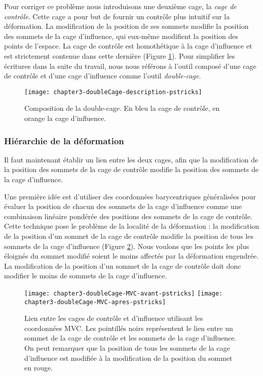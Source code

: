 Pour corriger ce problème nous introduisons une deuxième cage, la \textit{cage
de contrôle}. Cette cage a pour but de fournir un contrôle plus intuitif sur
la déformation. La modification de la position de ses sommets modifie la
position des sommets de la cage d'influence, qui eux-même modifient la
position des points de l'espace. La cage de contrôle est homothétique à la
cage d'influence et est strictement contenue dans cette dernière (Figure
\ref{MELDou}). Pour simplifier les écritures dans la suite du travail, nous
nous référons à l'outil composé d'une cage de contrôle et d'une cage
d'influence comme l'outil \textit{double-cage}.

\begin{figure}[!ht]
    \texttt{[image: chapter3-doubleCage-description-pstricks]}

    \caption[Composition de la double-cage] {Composition de la double-cage. En
    bleu la cage de contrôle, en orange la cage d'influence.}

    \label{MELDou}
\end{figure}

\subsubsection{Hiérarchie de la déformation}

Il faut maintenant établir un lien entre les deux cages, afin que la
modification de la position des sommets de la cage de contrôle modifie la
position des sommets de la cage d'influence.

Une première idée est d'utiliser des coordonnées barycentriques généralisées
pour évaluer la position de chacun des sommets de la cage d'influence comme
une combinaison linéaire pondérée des positions des sommets de la cage de
contrôle. Cette technique pose le problème de la localité de la déformation :
la modification de la position d'un sommet de la cage de contrôle modifie la
position de tous les sommets de la cage d'influence (Figure \ref{MELDMV}).
Nous voulons que les points les plus éloignés du sommet modifié soient le
moins affectés par la déformation engendrée. La modification de la position
d'un sommet de la cage de contrôle doit donc modifier le moins de sommets de
la cage d'influence.

\begin{figure}[!ht]
  \texttt{[image: chapter3-doubleCage-MVC-avant-pstricks]}
  \texttt{[image: chapter3-doubleCage-MVC-apres-pstricks]}

  \caption[Lien double-cage MVC] {Lien entre les cages de contrôle et
d'influence utilisant les coordonnées MVC. Les pointillés noirs représentent
le lien entre un sommet de la cage de contrôle et les sommets de la cage
d'influence. On peut remarquer que la position de tous les sommets de la cage
d'influence est modifiée à la modification de la position du sommet en rouge.}

  \label{MELDMV}
\end{figure}

